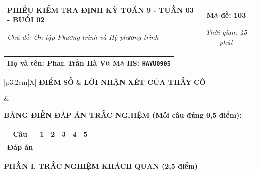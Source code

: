 \documentclass[12pt,a4paper]{article}
\begin{document}
\newpage


\noindent
\begin{tabularx}{\linewidth}{|X|c|}
\hline
\textbf{PHIẾU KIỂM TRA ĐỊNH KỲ TOÁN 9 - TUẦN 03 - BUỔI 02} & \textbf{Mã đề: 103} \\
\textit{Chủ đề: Ôn tập Phương trình và Hệ phương trình} & \textit{Thời gian: 45 phút} \\
\hline
\end{tabularx}

\vspace{1mm}

\noindent
\begin{tabularx}{\linewidth}{|X|}
\hline
\rule[-2mm]{0pt}{7.5mm}\textbf{Họ và tên:} \textbf{\large Phan Trần Hà Vũ} \hfill \textbf{Mã HS:} \texttt{HAVU0905} \quad \\
\hline
\end{tabularx}

\vspace{1mm}

\noindent
\begin{tabularx}{\linewidth}{|p{3.2cm}|X|}
\hline
\centering\textbf{ĐIỂM SỐ} & \centering\textbf{LỜI NHẬN XÉT CỦA THẦY CÔ} \tabularnewline
\hline
\rule{0pt}{1.3cm} & \tabularnewline
\hline
\end{tabularx}

\vspace{1.2mm}

\noindent\textbf{BẢNG ĐIỀN ĐÁP ÁN TRẮC NGHIỆM (Mỗi câu đúng 0,5 điểm):}
\vspace{0.8mm}

\noindent
\renewcommand{\arraystretch}{1.35}
\begin{tabularx}{\linewidth}{|c|*{5}{>{\centering\arraybackslash}X|}}
\hline
\textbf{Câu} & \textbf{1} & \textbf{2} & \textbf{3} & \textbf{4} & \textbf{5} \\
\hline
\textbf{Đáp án} & & & & & \\
\hline
\end{tabularx}
\renewcommand{\arraystretch}{1.0}

\vspace{1.5mm}

\noindent\textbf{\large PHẦN I. TRẮC NGHIỆM KHÁCH QUAN (2,5 điểm)}
\vspace{1mm}
\end{document}
